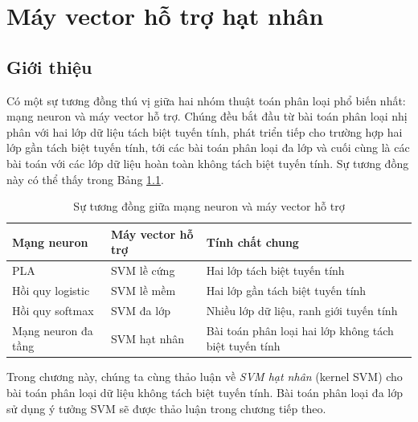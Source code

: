 \chapter{Máy vector hỗ trợ hạt nhân}
\label{cha:kernelsvm}
\section{Giới thiệu}
 
Có một sự tương đồng thú vị giữa hai nhóm thuật toán phân loại phổ biến nhất: mạng neuron và máy vector hỗ trợ. Chúng đều bắt đầu từ bài toán phân loại nhị phân 
với hai lớp dữ liệu tách biệt tuyến tính, phát triển tiếp cho trường hợp hai lớp gần tách biệt tuyến tính, tới các bài toán phân loại đa lớp và cuối cùng là các
bài toán với các lớp dữ liệu hoàn toàn không tách biệt tuyến tính. Sự tương đồng này 
có thể thấy trong Bảng \ref{tab:21_1}.
 
 
\begin{table}[h!]
\centering
\caption{Sự tương đồng giữa mạng neuron và máy vector hỗ trợ}
\label{tab:21_1}
\def\arraystretch{1.5}
\setlength\tabcolsep{5pt}
\begin{tabular}{|l|l|l|}
\hline
\textbf{Mạng neuron} & \textbf{Máy vector hỗ trợ}& \textbf{Tính chất chung} \\ \hline
PLA                 &  SVM lề cứng        & Hai lớp tách biệt tuyến tính             \\ \hline  
Hồi quy logistic & SVM lề mềm    & Hai lớp gần tách biệt tuyến tính        \\ \hline 
Hồi quy softmax     & SVM đa lớp   & Nhiều lớp dữ liệu, ranh giới tuyến tính              \\ \hline 
Mạng neuron đa tầng & SVM hạt nhân         & Bài toán phân loại hai lớp không tách biệt tuyến tính \\ \hline
\end{tabular}
\end{table}
 
Trong chương này, chúng ta cùng thảo luận về \textit{SVM hạt nhân} (kernel SVM) cho bài toán phân loại dữ liệu không tách biệt tuyến tính. Bài toán phân loại đa lớp sử dụng ý tưởng SVM sẽ được thảo luận trong chương tiếp theo.


